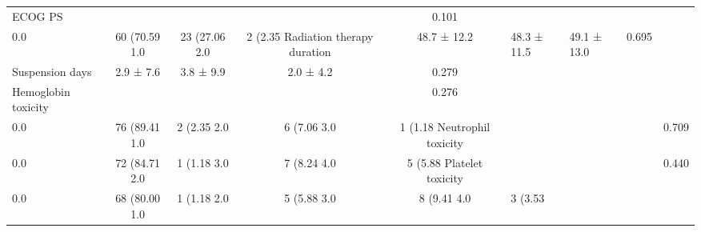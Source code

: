 \begin{table}[!ht]
\begin{tabular}{lcccc}
ECOG PS & & & & 0.101 \\
\hspace{3mm} 0.0 & 60 (70.59%
\hspace{3mm} 1.0 & 23 (27.06%
\hspace{3mm} 2.0 & 2 (2.35%
Radiation therapy duration & 48.7 ± 12.2 & 48.3 ± 11.5 & 49.1 ± 13.0 & 0.695 \\
Suspension days & 2.9 ± 7.6 & 3.8 ± 9.9 & 2.0 ± 4.2 & 0.279 \\
Hemoglobin toxicity & & & & 0.276 \\
\hspace{3mm} 0.0 & 76 (89.41%
\hspace{3mm} 1.0 & 2 (2.35%
\hspace{3mm} 2.0 & 6 (7.06%
\hspace{3mm} 3.0 & 1 (1.18%
Neutrophil toxicity & & & & 0.709 \\
\hspace{3mm} 0.0 & 72 (84.71%
\hspace{3mm} 2.0 & 1 (1.18%
\hspace{3mm} 3.0 & 7 (8.24%
\hspace{3mm} 4.0 & 5 (5.88%
Platelet toxicity & & & & 0.440 \\
\hspace{3mm} 0.0 & 68 (80.00%
\hspace{3mm} 1.0 & 1 (1.18%
\hspace{3mm} 2.0 & 5 (5.88%
\hspace{3mm} 3.0 & 8 (9.41%
\hspace{3mm} 4.0 & 3 (3.53%

\end{tabular}
\end{table}
